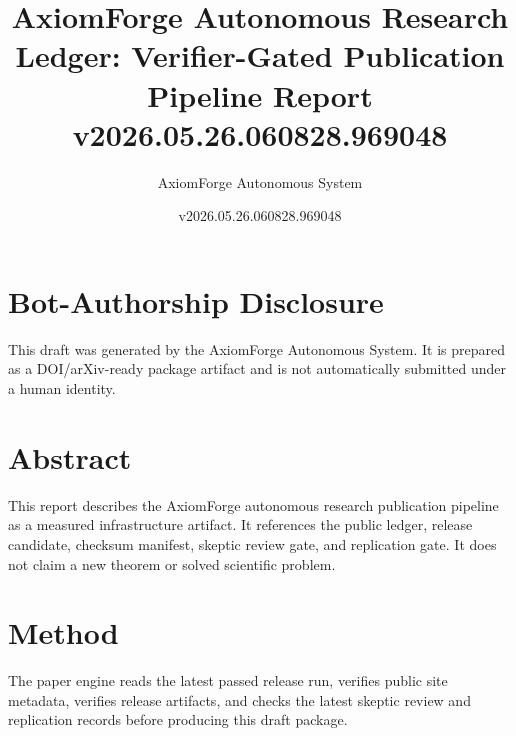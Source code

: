 \documentclass[11pt]{article}
\title{AxiomForge Autonomous Research Ledger: Verifier-Gated Publication Pipeline Report v2026.05.26.060828.969048}
\author{AxiomForge Autonomous System}
\date{v2026.05.26.060828.969048}
\begin{document}
\maketitle

\section*{Bot-Authorship Disclosure}
This draft was generated by the AxiomForge Autonomous System. It is prepared as
a DOI/arXiv-ready package artifact and is not automatically submitted under a
human identity.

\section*{Abstract}
This report describes the AxiomForge autonomous research publication pipeline
as a measured infrastructure artifact. It references the public ledger,
release candidate, checksum manifest, skeptic review gate, and replication gate.
It does not claim a new theorem or solved scientific problem.

\section*{Method}
The paper engine reads the latest passed release run, verifies public site
metadata, verifies release artifacts, and checks the latest skeptic review and
replication records before producing this draft package.
\end{document}
